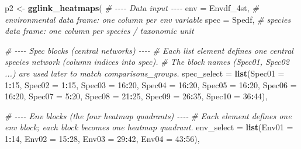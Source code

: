 \documentclass[
]{book}
\newenvironment{Shaded}{\begin{snugshade}}{\end{snugshade}}
\newcommand{\AttributeTok}[1]{\textcolor[rgb]{0.13,0.29,0.53}{#1}}
\newcommand{\CommentTok}[1]{\textcolor[rgb]{0.56,0.35,0.01}{\textit{#1}}}
\newcommand{\DecValTok}[1]{\textcolor[rgb]{0.00,0.00,0.81}{#1}}
\newcommand{\FunctionTok}[1]{\textcolor[rgb]{0.13,0.29,0.53}{\textbf{#1}}}
\newcommand{\NormalTok}[1]{#1}
\newcommand{\OtherTok}[1]{\textcolor[rgb]{0.56,0.35,0.01}{#1}}
\newcommand{\SpecialCharTok}[1]{\textcolor[rgb]{0.81,0.36,0.00}{\textbf{#1}}}
\begin{document}
\begin{Shaded}
\begin{Highlighting}[]
\NormalTok{p2 }\OtherTok{\textless{}{-}} \FunctionTok{gglink\_heatmaps}\NormalTok{(}
  \CommentTok{\# {-}{-}{-}{-} Data input {-}{-}{-}{-}}
  \AttributeTok{env                =}\NormalTok{ Envdf\_4st,            }\CommentTok{\# environmental data frame: one column per env variable}
  \AttributeTok{spec               =}\NormalTok{ Spedf,                }\CommentTok{\# species data frame: one column per species / taxonomic unit}

  \CommentTok{\# {-}{-}{-}{-} Spec blocks (central networks) {-}{-}{-}{-}}
  \CommentTok{\# Each list element defines one central species network (column indices into \textasciigrave{}spec\textasciigrave{}).}
  \CommentTok{\# The block names (Spec01, Spec02 ...) are used later to match \textasciigrave{}comparisons\_groups\textasciigrave{}.}
  \AttributeTok{spec\_select        =} \FunctionTok{list}\NormalTok{(}\AttributeTok{Spec01 =} \DecValTok{1}\SpecialCharTok{:}\DecValTok{15}\NormalTok{,}
                            \AttributeTok{Spec02 =} \DecValTok{1}\SpecialCharTok{:}\DecValTok{15}\NormalTok{,}
                            \AttributeTok{Spec03 =} \DecValTok{16}\SpecialCharTok{:}\DecValTok{20}\NormalTok{,}
                            \AttributeTok{Spec04 =} \DecValTok{16}\SpecialCharTok{:}\DecValTok{20}\NormalTok{,}
                            \AttributeTok{Spec05 =} \DecValTok{16}\SpecialCharTok{:}\DecValTok{20}\NormalTok{,}
                            \AttributeTok{Spec06 =} \DecValTok{16}\SpecialCharTok{:}\DecValTok{20}\NormalTok{,}
                            \AttributeTok{Spec07 =} \DecValTok{5}\SpecialCharTok{:}\DecValTok{20}\NormalTok{,}
                            \AttributeTok{Spec08 =} \DecValTok{21}\SpecialCharTok{:}\DecValTok{25}\NormalTok{,}
                            \AttributeTok{Spec09 =} \DecValTok{26}\SpecialCharTok{:}\DecValTok{35}\NormalTok{,}
                            \AttributeTok{Spec10 =} \DecValTok{36}\SpecialCharTok{:}\DecValTok{44}\NormalTok{),}

  \CommentTok{\# {-}{-}{-}{-} Env blocks (the four heatmap quadrants) {-}{-}{-}{-}}
  \CommentTok{\# Each element defines one env block; each block becomes one heatmap quadrant.}
  \AttributeTok{env\_select         =} \FunctionTok{list}\NormalTok{(}\AttributeTok{Env01 =} \DecValTok{1}\SpecialCharTok{:}\DecValTok{14}\NormalTok{,}
                            \AttributeTok{Env02 =} \DecValTok{15}\SpecialCharTok{:}\DecValTok{28}\NormalTok{,}
                            \AttributeTok{Env03 =} \DecValTok{29}\SpecialCharTok{:}\DecValTok{42}\NormalTok{,}
                            \AttributeTok{Env04 =} \DecValTok{43}\SpecialCharTok{:}\DecValTok{56}\NormalTok{),}


\end{Highlighting}
\end{Shaded}
\end{document}
